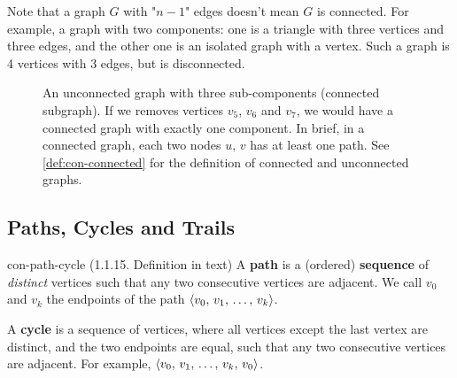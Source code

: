 \documentclass[../src/handouts/main.tex]{subfiles}
\begin{document}
Note that a graph $G$ with "$n - 1$" edges doesn't mean $G$ is connected. For example, a graph with two components: one is a triangle with three vertices and three edges, and the other one is an isolated graph with a vertex. Such a graph is 4 vertices with 3 edges, but is disconnected.


\begin{figure}[ht]
  \centering
  \caption{An unconnected graph with three sub-components (connected subgraph). If we removes vertices $v_5$, $v_6$ and $v_7$, we would have a connected graph with exactly one component. In brief, in a connected graph, each two nodes $u,\, v$ has at least one path. See \cref{def:con-connected} for the definition of connected and unconnected graphs.}
  \label{fig:con-connected-graph-interlude}
\end{figure}

\subsection{Paths, Cycles and Trails}\label{subsec:con-path}

\begin{definition}{}{con-path-cycle}
  (1.1.15. Definition in text)
  A \textbf{path} is a (ordered) \textbf{sequence} of \textit{distinct} vertices such that any two consecutive vertices are adjacent. We call $v_0$ and $v_k$ the endpoints of the path $\langle v_0,\, v_1,\, \ldots,\, v_k\rangle$.

  A \textbf{cycle} is a sequence of vertices, where all vertices except the last vertex are distinct, and the two endpoints are equal, such that any two consecutive vertices are adjacent. For example, $\langle v_0,\, v_1,\, \ldots,\, v_k,\, v_0\rangle$.
\end{definition}
\end{document}
